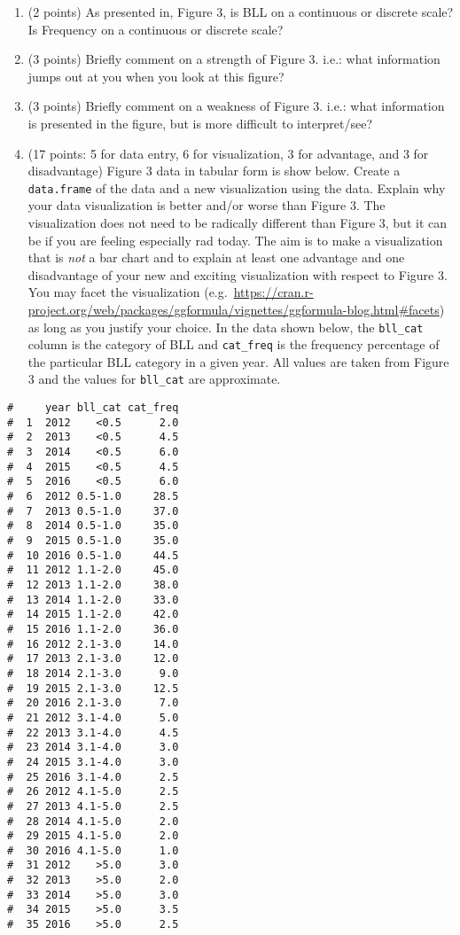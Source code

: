 \documentclass[letterpaper,11pt,twoside,]{pinp}
\begin{document}
\begin{enumerate}
\def\labelenumi{\alph{enumi})}
\item
  (2 points) As presented in, Figure 3, is BLL on a continuous or
  discrete scale? Is Frequency on a continuous or discrete scale?
\item
  (3 points) Briefly comment on a strength of Figure 3. i.e.: what
  information jumps out at you when you look at this figure?
\item
  (3 points) Briefly comment on a weakness of Figure 3. i.e.: what
  information is presented in the figure, but is more difficult to
  interpret/see?
\item
  (17 points: 5 for data entry, 6 for visualization, 3 for advantage,
  and 3 for disadvantage) Figure 3 data in tabular form is show below.
  Create a \texttt{data.frame} of the data and a new visualization using
  the data. Explain why your data visualization is better and/or worse
  than Figure 3. The visualization does not need to be radically
  different than Figure 3, but it can be if you are feeling especially
  rad today. The aim is to make a visualization that is \emph{not} a bar
  chart and to explain at least one advantage and one disadvantage of
  your new and exciting visualization with respect to Figure 3. You may
  facet the visualization
  (e.g.~\url{https://cran.r-project.org/web/packages/ggformula/vignettes/ggformula-blog.html\#facets})
  as long as you justify your choice. In the data shown below, the
  \texttt{bll\_cat} column is the category of BLL and \texttt{cat\_freq}
  is the frequency percentage of the particular BLL category in a given
  year. All values are taken from Figure 3 and the values for
  \texttt{bll\_cat} are approximate.
\end{enumerate}

\begin{ShadedResult}
\begin{verbatim}
#     year bll_cat cat_freq
#  1  2012    <0.5      2.0
#  2  2013    <0.5      4.5
#  3  2014    <0.5      6.0
#  4  2015    <0.5      4.5
#  5  2016    <0.5      6.0
#  6  2012 0.5-1.0     28.5
#  7  2013 0.5-1.0     37.0
#  8  2014 0.5-1.0     35.0
#  9  2015 0.5-1.0     35.0
#  10 2016 0.5-1.0     44.5
#  11 2012 1.1-2.0     45.0
#  12 2013 1.1-2.0     38.0
#  13 2014 1.1-2.0     33.0
#  14 2015 1.1-2.0     42.0
#  15 2016 1.1-2.0     36.0
#  16 2012 2.1-3.0     14.0
#  17 2013 2.1-3.0     12.0
#  18 2014 2.1-3.0      9.0
#  19 2015 2.1-3.0     12.5
#  20 2016 2.1-3.0      7.0
#  21 2012 3.1-4.0      5.0
#  22 2013 3.1-4.0      4.5
#  23 2014 3.1-4.0      3.0
#  24 2015 3.1-4.0      3.0
#  25 2016 3.1-4.0      2.5
#  26 2012 4.1-5.0      2.5
#  27 2013 4.1-5.0      2.5
#  28 2014 4.1-5.0      2.0
#  29 2015 4.1-5.0      2.0
#  30 2016 4.1-5.0      1.0
#  31 2012    >5.0      3.0
#  32 2013    >5.0      2.0
#  33 2014    >5.0      3.0
#  34 2015    >5.0      3.5
#  35 2016    >5.0      2.5
\end{verbatim}
\end{ShadedResult}
\end{document}
